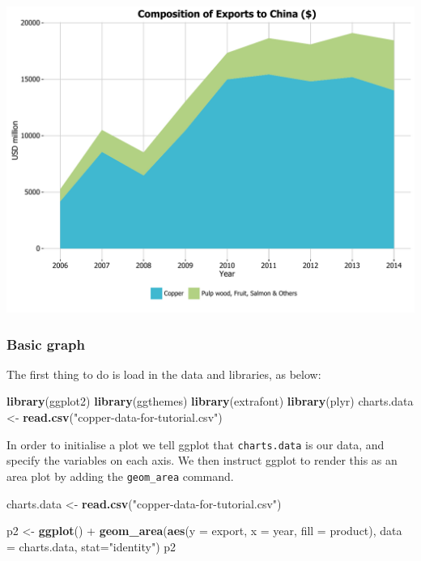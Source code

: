 \documentclass[]{article}
\newenvironment{Shaded}{\begin{snugshade}}{\end{snugshade}}
\newcommand{\KeywordTok}[1]{\textcolor[rgb]{0.13,0.29,0.53}{\textbf{{#1}}}}
\newcommand{\DataTypeTok}[1]{\textcolor[rgb]{0.13,0.29,0.53}{{#1}}}
\newcommand{\StringTok}[1]{\textcolor[rgb]{0.31,0.60,0.02}{{#1}}}
\newcommand{\NormalTok}[1]{{#1}}
\begin{document}
\begin{center}\includegraphics{0_all_posts_pdf/area_final-1} \end{center}

\subsubsection{Basic graph}\label{basic-graph-1}

The first thing to do is load in the data and libraries, as below:

\begin{Shaded}
\begin{Highlighting}[]
\KeywordTok{library}\NormalTok{(ggplot2)}
\KeywordTok{library}\NormalTok{(ggthemes)}
\KeywordTok{library}\NormalTok{(extrafont)}
\KeywordTok{library}\NormalTok{(plyr)}
\NormalTok{charts.data <-}\StringTok{ }\KeywordTok{read.csv}\NormalTok{(}\StringTok{"copper-data-for-tutorial.csv"}\NormalTok{)}
\end{Highlighting}
\end{Shaded}

In order to initialise a plot we tell ggplot that \texttt{charts.data}
is our data, and specify the variables on each axis. We then instruct
ggplot to render this as an area plot by adding the \texttt{geom\_area}
command.

\begin{Shaded}
\begin{Highlighting}[]
\NormalTok{charts.data <-}\StringTok{ }\KeywordTok{read.csv}\NormalTok{(}\StringTok{"copper-data-for-tutorial.csv"}\NormalTok{)}

\NormalTok{p2 <-}\StringTok{ }\KeywordTok{ggplot}\NormalTok{() +}\StringTok{ }\KeywordTok{geom_area}\NormalTok{(}\KeywordTok{aes}\NormalTok{(}\DataTypeTok{y =} \NormalTok{export, }\DataTypeTok{x =} \NormalTok{year, }\DataTypeTok{fill =} \NormalTok{product), }\DataTypeTok{data =} \NormalTok{charts.data, }
                           \DataTypeTok{stat=}\StringTok{"identity"}\NormalTok{)}
\NormalTok{p2}
\end{Highlighting}
\end{Shaded}
\end{document}
